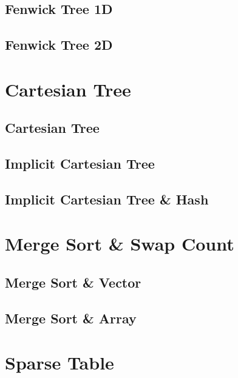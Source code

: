 \documentclass[10pt,a4paper]{report}
\begin{document}
		\subsection{Fenwick Tree 1D}
			
		\newpage
		\subsection{Fenwick Tree 2D}
			
	\newpage	
	\section{Cartesian Tree}
		\subsection{Cartesian Tree}
			
		\newpage
		\subsection{Implicit Cartesian Tree}
			
		\newpage
		\subsection{Implicit Cartesian Tree \& Hash}
			
	\newpage		
	\section{Merge Sort \& Swap Count}
		\subsection{Merge Sort \& Vector}
			
		\newpage
		\subsection{Merge Sort \& Array}
			
	\newpage
	\section{Sparse Table}
		
	\newpage	
\end{document}
